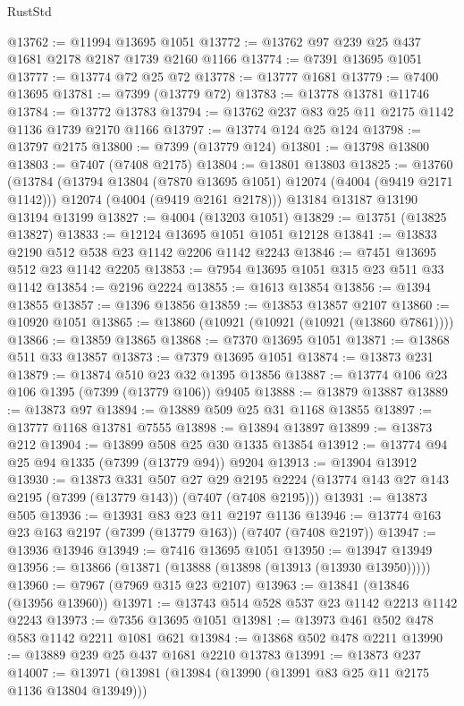 \begin{lexlean}{RustStd}
\begin{coremodule}
@13762 := @11994 @13695 @1051
@13772 := @13762 @97 @239 @25 @437 @1681 @2178 @2187 @1739 @2160 @1166
@13774 := @7391 @13695 @1051
@13777 := @13774 @72 @25 @72
@13778 := @13777 @1681
@13779 := @7400 @13695
@13781 := @7399 (@13779 @72)
@13783 := @13778 @13781 @11746
@13784 := @13772 @13783
@13794 := @13762 @237 @83 @25 @11 @2175 @1142 @1136 @1739 @2170 @1166
@13797 := @13774 @124 @25 @124
@13798 := @13797 @2175
@13800 := @7399 (@13779 @124)
@13801 := @13798 @13800
@13803 := @7407 (@7408 @2175)
@13804 := @13801 @13803
@13825 := @13760
    (@13784
      (@13794 @13804 (@7870 @13695 @1051) @12074 (@4004 (@9419 @2171 @1142)))
      @12074
      (@4004 (@9419 @2161 @2178)))
    @13184
    @13187
    @13190
    @13194
    @13199
@13827 := @4004 (@13203 @1051)
@13829 := @13751 (@13825 @13827)
@13833 := @12124 @13695 @1051 @1051 @12128
@13841 := @13833 @2190 @512 @538 @23 @1142 @2206 @1142 @2243
@13846 := @7451 @13695 @512 @23 @1142 @2205
@13853 := @7954 @13695 @1051 @315 @23 @511 @33 @1142
@13854 := @2196 @2224
@13855 := @1613 @13854
@13856 := @1394 @13855
@13857 := @1396 @13856
@13859 := @13853 @13857 @2107
@13860 := @10920 @1051
@13865 := @13860 (@10921 (@10921 (@10921 (@13860 @7861))))
@13866 := @13859 @13865
@13868 := @7370 @13695 @1051
@13871 := @13868 @511 @33 @13857
@13873 := @7379 @13695 @1051
@13874 := @13873 @231
@13879 := @13874 @510 @23 @32 @1395 @13856
@13887 := @13774 @106 @23 @106 @1395 (@7399 (@13779 @106)) @9405
@13888 := @13879 @13887
@13889 := @13873 @97
@13894 := @13889 @509 @25 @31 @1168 @13855
@13897 := @13777 @1168 @13781 @7555
@13898 := @13894 @13897
@13899 := @13873 @212
@13904 := @13899 @508 @25 @30 @1335 @13854
@13912 := @13774 @94 @25 @94 @1335 (@7399 (@13779 @94)) @9204
@13913 := @13904 @13912
@13930 := @13873
    @331
    @507
    @27
    @29
    @2195
    @2224
    (@13774 @143 @27 @143 @2195 (@7399 (@13779 @143)) (@7407 (@7408 @2195)))
@13931 := @13873 @505
@13936 := @13931 @83 @23 @11 @2197 @1136
@13946 := @13774 @163 @23 @163 @2197 (@7399 (@13779 @163)) (@7407 (@7408 @2197))
@13947 := @13936 @13946
@13949 := @7416 @13695 @1051
@13950 := @13947 @13949
@13956 := @13866 (@13871 (@13888 (@13898 (@13913 (@13930 @13950)))))
@13960 := @7967 (@7969 @315 @23 @2107)
@13963 := @13841 (@13846 (@13956 @13960))
@13971 := @13743 @514 @528 @537 @23 @1142 @2213 @1142 @2243
@13973 := @7356 @13695 @1051
@13981 := @13973 @461 @502 @478 @583 @1142 @2211 @1081 @621
@13984 := @13868 @502 @478 @2211
@13990 := @13889 @239 @25 @437 @1681 @2210 @13783
@13991 := @13873 @237
@14007 := @13971
    (@13981
      (@13984 (@13990 (@13991 @83 @25 @11 @2175 @1136 @13804 @13949)))

\end{coremodule}
\end{lexlean}

